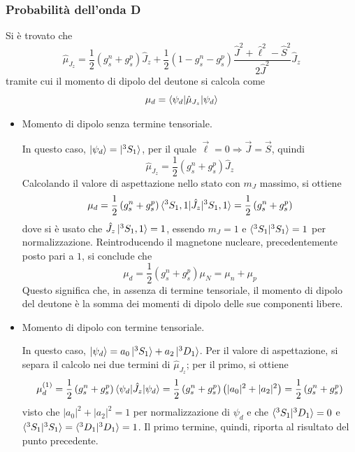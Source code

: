 \documentclass[11pt, a4paper]{scrartcl}
\theoremstyle{style}
\numberwithin{equation}{subsection}
\begin{document}
\subsubsection{Probabilit\`a dell'onda D}

Si \`e trovato che 
\[
	\hat{\mu }_{J_z} = \frac{1}{2} \left(g_s^n + g_s^p\right) \hat{J}_z + \frac{1}{2} \left(1 - g_s^n - g_s^p\right) \frac{\hat{J}^2 + \hat{\ell }^2 - \hat{S}^2}{2 \hat{J} ^2} \hat{J}_z
\] 
tramite cui il momento di dipolo del deutone si calcola come
\[
\mu _d = \braket{\psi _d|\hat{\mu }_{J_z}|\psi _d} 
\] 
\begin{itemize}
	\item Momento di dipolo senza termine tensoriale.

		In questo caso, $\ket{\psi _d}  = \ket{^3S_1}$, per il quale $\vec{\ell } = 0 \Rightarrow  \vec{J}= \vec{S}$, quindi
		\[
		\hat{\mu }_{J_z} = \frac{1}{2} \left(g_s^n + g_s^p\right) \hat{J}_z
		\] 
	Calcolando il valore di aspettazione nello stato con $m_J$ massimo, si ottiene
	\[
	\mu _d = \frac{1}{2} \left(g_s^n + g_s^p\right)  \braket{^3 S_1 , 1| \hat{J}_z| ^3S_1 , 1}  = \frac{1}{2} \left(g_s^n + g_s^p\right) 
	\] 
dove si \`e usato che $\hat{J}_z \ket{^3 S_1 , 1} =1$, essendo $m_J = 1$ e $\braket{^3S_1|^3S_1} = 1$ per normalizzazione.	
Reintroducendo il magnetone nucleare, precedentemente posto pari a $1$, si conclude che 
\[
\mu _d = \frac{1}{2} \left(g_s^n + g_s^p\right)\mu _N = \mu _n + \mu _p
\] 
Questo significa che, in assenza di termine tensoriale, il momento di dipolo del deutone \`e la somma dei momenti di dipolo delle sue componenti libere.

\item Momento di dipolo con termine tensoriale.

	In questo caso, $\ket{\psi _d}  = a_0 \ket{^3 S_1}  + a_2 \ket{^3D_1} $.
	Per il valore di aspettazione, si separa il calcolo nei due termini di $\hat{\mu }_{J_z}$; per il primo, si ottiene
	\[
	\mu _d^{(1)} = \frac{1}{2} \left(g_s^n + g_s^p\right)  \braket{\psi _d| \hat{J}_{z}|\psi _d} = \frac{1}{2}\left(g_s^n + g_s^p\right) \left(\lvert a_0 \rvert ^2 + \lvert a_2 \rvert ^2\right)  = \frac{1}{2}\left(g_s^n + g_s^p\right) 
	\] 
visto che $\lvert a_0 \rvert ^2 + \lvert a_2 \rvert ^2 = 1$ per normalizzazione di $\psi _d$ e che $\braket{^3S_1|^3 D_1}  = 0$ e $\braket{^3S_1|^3S_1} = \braket{^3D_1|^3D_1} =1$.
Il primo termine, quindi, riporta al risultato del punto precedente.


\end{itemize}
\end{document}
